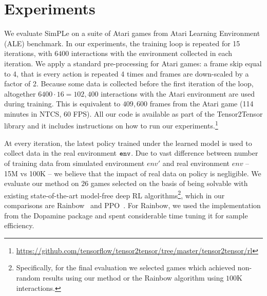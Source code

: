 \section{Experiments}
\label{sec:experiments}

We evaluate SimPLe on a suite of Atari games from Atari Learning Environment (ALE) benchmark.
In our experiments, the training loop is repeated for 15 iterations, with $6400$ interactions with the environment collected in each iteration.
We apply a standard pre-processing for Atari games: a frame skip equal to 4, that is every action
is repeated 4 times and frames are down-scaled by a factor of 2.
Because some data is collected before the first iteration of the loop,
altogether $6400 \cdot 16 = 102,400$ interactions with the Atari environment are used during training.
This is equivalent to $409,600$ frames from the Atari game (114 minutes in NTCS, 60 FPS).
All our code is available as part of the Tensor2Tensor library and it includes instructions on how
to run our experiments.\footnote{\url{https://github.com/tensorflow/tensor2tensor/tree/master/tensor2tensor/rl}} 



At every iteration, the latest policy trained under the learned model is used to collect data in the real environment ${\texttt{env}}$.
Due to vast difference between number of training data from simulated environment $env'$ and real environment $env$ -- 15M vs 100K
-- we believe that the impact of real data on policy is negligible.
 We evaluate our method on $26$ games selected on the basis of being solvable with existing state-of-the-art model-free deep RL algorithms\footnote{Specifically, for the final evaluation we selected games which achieved non-random results using our method or the Rainbow algorithm using $100$K interactions.}, which in our comparisons are Rainbow~\cite{rainbow} and PPO~\cite{ppo}.
 For Rainbow, we used the implementation from the Dopamine package and spent considerable
 time tuning it for sample efficiency.

